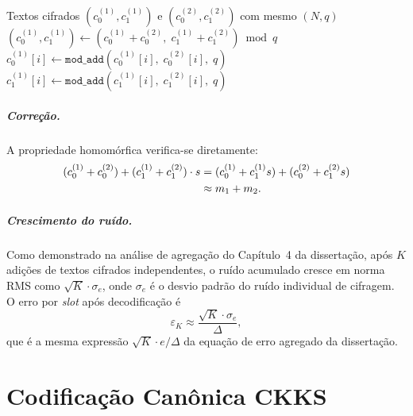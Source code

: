 \documentclass[11pt,a4paper]{report}
\begin{document}
\begin{algorithm}[ht]
\caption{\texttt{add\_inplace}: adição homomórfica in-place}
\label{alg:add_inplace}
\begin{algorithmic}[1]
\Require Textos cifrados $(c_0^{(1)}, c_1^{(1)})$ e $(c_0^{(2)}, c_1^{(2)})$ com mesmo $(N, q)$
\Ensure $(c_0^{(1)}, c_1^{(1)}) \gets (c_0^{(1)} + c_0^{(2)},\; c_1^{(1)} + c_1^{(2)}) \bmod q$
  \State $c_0^{(1)}[i] \gets \texttt{mod\_add}(c_0^{(1)}[i],\; c_0^{(2)}[i],\; q)$
\EndFor
{}
  \State $c_1^{(1)}[i] \gets \texttt{mod\_add}(c_1^{(1)}[i],\; c_1^{(2)}[i],\; q)$
\EndFor
\end{algorithmic}
\end{algorithm}

\paragraph{Correção.} A propriedade homomórfica verifica-se diretamente:
\begin{align}
  (c_0^{(1)}+c_0^{(2)}) + (c_1^{(1)}+c_1^{(2)}) \cdot s
    &= (c_0^{(1)} + c_1^{(1)} s) + (c_0^{(2)} + c_1^{(2)} s) \notag \\
    &\approx m_1 + m_2.
    \label{eq:add_homo}
\end{align}

\paragraph{Crescimento do ruído.} Como demonstrado na análise de agregação do Capítulo~4
da dissertação, após $K$ adições de textos cifrados independentes, o ruído acumulado
cresce em norma RMS como $\sqrt{K} \cdot \sigma_e$, onde $\sigma_e$ é o desvio padrão
do ruído individual de cifragem. O erro por \emph{slot} após decodificação é
\begin{equation}
  \varepsilon_K \approx \frac{\sqrt{K} \cdot \sigma_e}{\Delta},
  \label{eq:noise_growth}
\end{equation}
que é a mesma expressão $\sqrt{K} \cdot e / \Delta$ da equação de erro agregado da
dissertação.

\chapter{Codificação Canônica CKKS}
\label{cap:encoder}
\end{document}
